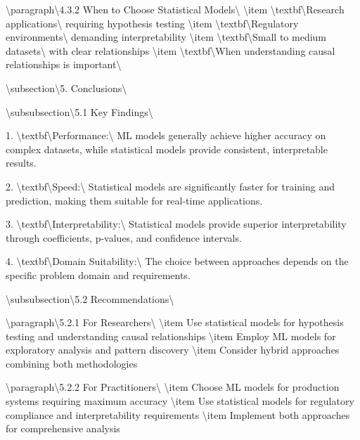 \documentclass[11pt,a4paper]{article}
\begin{document}
\textbackslash{}paragraph\textbackslash{}{4.3.2 When to Choose Statistical Models\textbackslash{}}
\textbackslash{}item \textbackslash{}textbf\textbackslash{}{Research applications\textbackslash{}} requiring hypothesis testing
\textbackslash{}item \textbackslash{}textbf\textbackslash{}{Regulatory environments\textbackslash{}} demanding interpretability
\textbackslash{}item \textbackslash{}textbf\textbackslash{}{Small to medium datasets\textbackslash{}} with clear relationships
\textbackslash{}item \textbackslash{}textbf\textbackslash{}{When understanding causal relationships is important\textbackslash{}}

\textbackslash{}subsection\textbackslash{}{5. Conclusions\textbackslash{}}

\textbackslash{}subsubsection\textbackslash{}{5.1 Key Findings\textbackslash{}}

1. \textbackslash{}textbf\textbackslash{}{Performance:\textbackslash{}} ML models generally achieve higher accuracy on complex datasets, while statistical models provide consistent, interpretable results.

2. \textbackslash{}textbf\textbackslash{}{Speed:\textbackslash{}} Statistical models are significantly faster for training and prediction, making them suitable for real-time applications.

3. \textbackslash{}textbf\textbackslash{}{Interpretability:\textbackslash{}} Statistical models provide superior interpretability through coefficients, p-values, and confidence intervals.

4. \textbackslash{}textbf\textbackslash{}{Domain Suitability:\textbackslash{}} The choice between approaches depends on the specific problem domain and requirements.

\textbackslash{}subsubsection\textbackslash{}{5.2 Recommendations\textbackslash{}}

\textbackslash{}paragraph\textbackslash{}{5.2.1 For Researchers\textbackslash{}}
\textbackslash{}item Use statistical models for hypothesis testing and understanding causal relationships
\textbackslash{}item Employ ML models for exploratory analysis and pattern discovery
\textbackslash{}item Consider hybrid approaches combining both methodologies

\textbackslash{}paragraph\textbackslash{}{5.2.2 For Practitioners\textbackslash{}}
\textbackslash{}item Choose ML models for production systems requiring maximum accuracy
\textbackslash{}item Use statistical models for regulatory compliance and interpretability requirements
\textbackslash{}item Implement both approaches for comprehensive analysis
\end{document}
